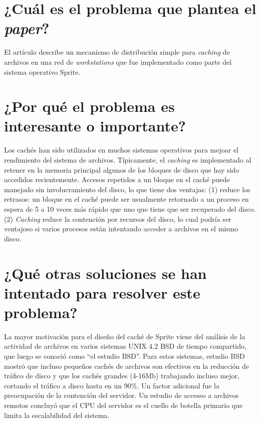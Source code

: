  
\section{¿Cuál es el problema que plantea el \textit{paper}?}
El artículo describe un mecanismo de distribución simple para \emph{caching} de archivos en una red de \emph{workstations} que fue implementado como parte del sistema operativo Sprite. 

\section{¿Por qué el problema es interesante o importante?}
Los cachés han sido utilizados en muchos sistemas operativos para mejoar el rendimiento del sistema de archivos. Típicamente, el \emph{caching} es implementado al retener en la memoria principal algunos de los bloques de disco que hay sido accedidos recientemente. Accesos repetidos a un bloque en el caché puede manejado sin involucramiento del disco, lo que tiene dos ventajas: (1) reduce los retrasos: un bloque en el caché puede ser usualmente retornado a un proceso en espera de 5 a 10 veces más rápido que uno que tiene que ser recuperado del disco. (2) \emph{Caching} reduce la contención por recursos del disco, lo cual podría ser ventajoso si varios procesos están intentando acceder a archivos en el mismo disco.

\section{¿Qué otras soluciones se han intentado para resolver este problema?}
La mayor motivación para el diseño del caché de Sprite viene del análisis de la actividad de archivos en varios sistemas UNIX 4.2 BSD de tiempo compartido, que luego se conoció como ``el estudio BSD''. Para estos sistemas, estudio BSD mostró que incluso pequeños cachés de archivos son efectivos en la reducción de tráfico de disco y que los cachés grandes (4-16Mb) trabajando incluso mejor, cortando el tráfico a disco hasta en un 90\%. Un factor adicional fue la preocupación de la contención del servidor. Un estudio de accesso a archivos remotos concluyó que el CPU del servidor es el cuello de botella primario que limita la escalabilidad del sistema.
     
